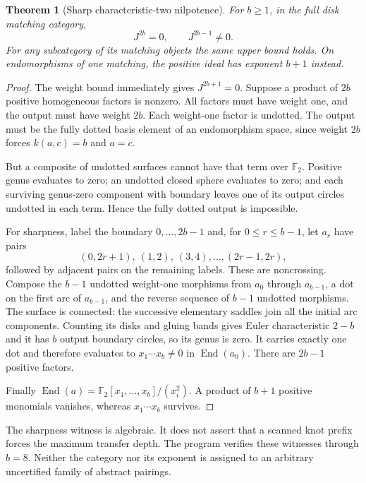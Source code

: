 \documentclass[11pt]{article}
\newtheorem{theorem}{Theorem}[section]
\theoremstyle{definition}\newtheorem{definition}[theorem]{Definition}
\theoremstyle{remark}\newtheorem{remark}[theorem]{Remark}
\newcommand{\F}{{\mathbb F_2}}
\newcommand{\End}{\operatorname{End}}
\begin{document}
\begin{theorem}[Sharp characteristic-two nilpotence]\label{thm:nilpotence}
For $b\ge1$, in the full disk matching category,
\[
 J^{2b}=0,\qquad J^{2b-1}\ne0.
\]
For any subcategory of its matching objects the same upper bound holds. On
endomorphisms of one matching, the positive ideal has exponent $b+1$ instead.
\end{theorem}
\begin{proof}
The weight bound immediately gives $J^{2b+1}=0$. Suppose a product of $2b$
positive homogeneous factors is nonzero. All factors must have weight one, and
the output must have weight $2b$. Each weight-one factor is undotted. The output
must be the fully dotted basis element of an endomorphism space, since weight
$2b$ forces $k(a,c)=b$ and $a=c$.

But a composite of undotted surfaces cannot have that term over $\F$. Positive
genus evaluates to zero; an undotted closed sphere evaluates to zero; and each
surviving genus-zero component with boundary leaves one of its output circles
undotted in each term. Hence the fully dotted output is impossible.

For sharpness, label the boundary $0,\ldots,2b-1$ and, for $0\le r\le b-1$, let
$a_r$ have pairs
\[
 (0,2r+1),\ (1,2),\ (3,4),\ldots,(2r-1,2r),
\]
followed by adjacent pairs on the remaining labels. These are noncrossing.
Compose the $b-1$ undotted weight-one morphisms from $a_0$ through $a_{b-1}$,
a dot on the first arc of $a_{b-1}$, and the reverse sequence of $b-1$ undotted
morphisms. The surface is connected: the successive elementary saddles join
all the initial arc components. Counting its disks and gluing bands gives Euler
characteristic $2-b$ and it has $b$ output boundary circles, so its genus is zero.
It carries exactly one dot and therefore evaluates to $x_1\cdots x_b\ne0$ in
$\End(a_0)$. There are $2b-1$ positive factors.

Finally $\End(a)=\F[x_1,\ldots,x_b]/(x_i^2)$. A product of $b+1$ positive
monomials vanishes, whereas $x_1\cdots x_b$ survives.
\end{proof}

The sharpness witness is algebraic. It does not assert that a scanned knot
prefix forces the maximum transfer depth. The program verifies these witnesses
through $b=8$. Neither the category nor its exponent is assigned to an arbitrary
uncertified family of abstract pairings.
\end{document}
